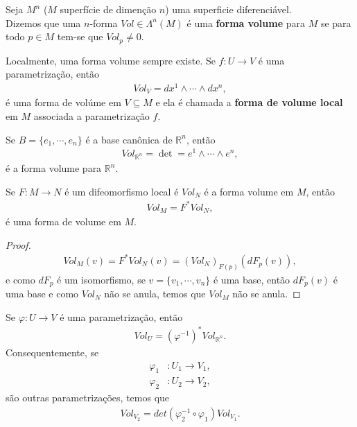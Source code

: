 \begin{definition}
  Seja $M^{n}$ ($M$ superfície de dimenção $n$) uma superficie diferenciável.\\
  Dizemos que uma $n$-forma $Vol\in\Lambda^{n}(M)$ é uma \textbf{forma volume} para $M$ se para todo $p\in M$ tem-se que $Vol_p\neq 0$. 
\end{definition}
Localmente, uma forma volume sempre existe. Se $f:U\to V$ é uma parametrização, então
\begin{align*}
  Vol_V=dx^{1}\wedge\cdots\wedge dx^{n},
\end{align*}
é uma forma de volúme em $V\subseteq M$ e ela é chamada a \textbf{forma de volume local} em $M$ associada a parametrização $f$.
\begin{example}
  Se $B=\{e_1,\cdots,e_n\}$ é a base canônica de $\mathbb{R}^{n}$, então
  \begin{align*}
    Vol_{\mathbb{R}^{n}}=\det=e^{1}\wedge\cdots\wedge e^{n},
  \end{align*}
  é a forma volume para $\mathbb{R}^{n}$.
\end{example}
\begin{proposition}
  Se $F:M\to N$ é um difeomorfismo local é $Vol_{N}$ é a forma volume em $M$, então
  \begin{align*}
    Vol_{M}=F^{\ast}Vol_{N},
  \end{align*}
  é uma forma de volume em $M$.
\end{proposition}
\begin{proof} 
  \begin{align*}
    Vol_{M}(v)=F^{\ast}Vol_{N}(v)=(Vol_N)_{F(p)}(dF_{p}(v)),
  \end{align*}
  e como $dF_{p}$ é um isomorfismo, se $v=\{v_1,\cdots,v_n\}$ é uma base, então $dF_{p}(v)$ é uma base e como $Vol_N$ não se anula, temos que $Vol_M$ não se anula. 
\end{proof}
\begin{corollary}
  Se $\varphi:U\to V$ é uma parametrização, então
  \begin{align*}
    Vol_U=(\varphi^{-1})^{\ast}Vol_{\mathbb{R}^{n}}.
  \end{align*}
  Consequentemente, se
  \begin{align*}
    \varphi_1&:U_1\to V_1,\\
    \varphi_2&:U_2\to V_2,
  \end{align*}
  são outras parametrizações, temos que
  \begin{align*}
    Vol_{V_2}=det(\varphi^{-1}_2\circ\varphi_1)Vol_{V_1}.
  \end{align*}
\end{corollary}
